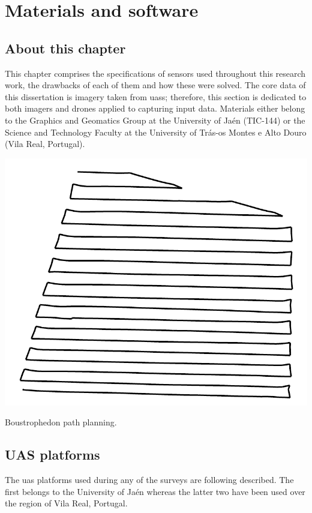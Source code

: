 \small\setchapterpreamble[u]{\margintoc}\normalsize
\chapter{Materials and software}
\label{sec:materials}

\section*{About this chapter}

This chapter comprises the specifications of sensors used throughout this research work, the drawbacks of each of them and how these were solved. The core data of this dissertation is imagery taken from \acrshort{uas}s; therefore, this section is dedicated to both imagers and drones applied to capturing input data. Materials either belong to the Graphics and Geomatics Group at the University of Jaén (TIC-144) or the Science and Technology Faculty at the University of Trás-os Montes e Alto Douro (Vila Real, Portugal). 

\begin{marginfigure}[.5cm]
    \centering
	\includegraphics[width=.8\linewidth]{figs/materials/boustrophedon.png}
	\caption{Boustrophedon path planning.}
    \label{fig:boustrophedon}
\end{marginfigure}
\section{UAS platforms}

The \acrshort{uas} platforms used during any of the surveys are following described. The first belongs to the University of Jaén whereas the latter two have been used over the region of Vila Real, Portugal.

